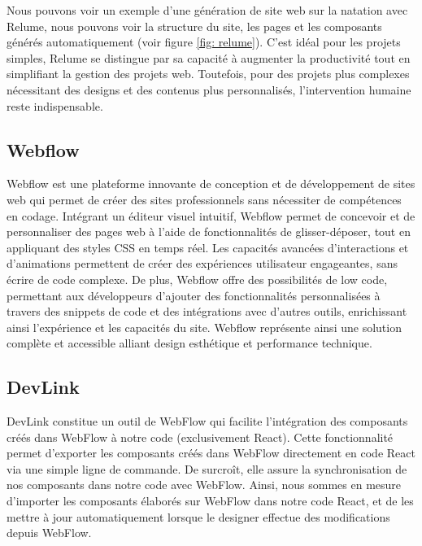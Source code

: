 Nous pouvons voir un exemple d'une génération de site web sur la natation avec Relume, nous pouvons voir la structure du site, les pages et les composants générés automatiquement (voir figure \ref{fig: relume}).
C'est idéal pour les projets simples, Relume se distingue par sa capacité à augmenter la productivité tout en simplifiant la gestion des projets web. Toutefois, pour des projets plus complexes nécessitant des designs et des contenus plus personnalisés, l’intervention humaine reste indispensable. 

\subsection{Webflow}
Webflow est une plateforme innovante de conception et de développement de sites web qui permet de créer des sites professionnels sans nécessiter de compétences en codage. Intégrant un éditeur visuel intuitif, Webflow permet de concevoir et de personnaliser des pages web à l'aide de fonctionnalités de glisser-déposer, tout en appliquant des styles CSS en temps réel. Les capacités avancées d'interactions et d'animations permettent de créer des expériences utilisateur engageantes, sans écrire de code complexe. De plus, Webflow offre des possibilités de low code, permettant aux développeurs d'ajouter des fonctionnalités personnalisées à travers des snippets de code et des intégrations avec d'autres outils, enrichissant ainsi l'expérience et les capacités du site. Webflow représente ainsi une solution complète et accessible alliant design esthétique et performance technique.

\subsection{DevLink}
DevLink constitue un outil de WebFlow qui facilite l'intégration des composants créés dans WebFlow à notre code (exclusivement React). Cette fonctionnalité permet d'exporter les composants créés dans WebFlow directement en code React via une simple ligne de commande. De surcroît, elle assure la synchronisation de nos composants dans notre code avec WebFlow. Ainsi, nous sommes en mesure d'importer les composants élaborés sur WebFlow dans notre code React, et de les mettre à jour automatiquement lorsque le designer effectue des modifications depuis WebFlow. 

